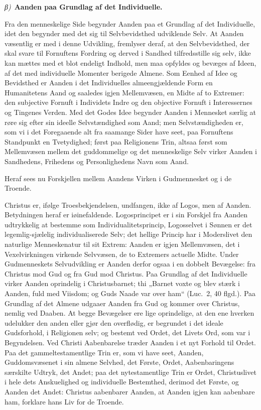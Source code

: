 \documentclass[12pt]{book}
\newcommand{\greekrun}[2]{%
  \medskip\begin{center}{\itshape #1)}\ {\bfseries #2}\end{center}\medskip}
\begin{document}
\greekrun{β}{Aanden paa Grundlag af det Individuelle.}

Fra den menneskelige Side begynder Aanden paa et Grundlag af det
Individuelle, idet den begynder med det sig til Selvbevidsthed
udviklende Selv. At Aanden væsentlig er med i denne Udvikling,
fremlyser deraf, at den Selvbevidsthed, der skal svare til
Fornuftens Fordring og derved i Sandhed tilfredsstille sig selv,
ikke kan mættes med et blot endeligt Indhold, men maa opfyldes og
bevæges af Ideen, af det med individuelle Momenter berigede Almene.
Som Eenhed af Idee og Bevidsthed er Aanden i det Individuelles
almeengjældende Form en Humanitetens Aand og saaledes igjen
Mellemvæsen, en Midte af to Extremer: den subjective Fornuft i
Individets
Indre og den objective Fornuft i Interessernes og Tingenes Verden.
Med det Godes Idee begynder Aanden i Mennesket særlig at røre sig
efter sin ideelle Selvstændighed som Aand; men Selvstændigheden er,
som vi i det Foregaaende alt fra saamange Sider have seet, paa
Fornuftens Standpunkt en Tvetydighed; først paa Religionens Trin,
altsaa først som Mellemvæsen mellem det guddommelige og det
menneskelige Selv virker Aanden i Sandhedens, Frihedens og
Personlighedens Navn som Aand.

Heraf sees nu Forskjellen mellem Aandens Virken i Gudmennesket og i
de Troende.

Christus er, ifølge Troesbekjendelsen, undfangen, ikke af Logos, men
af Aanden. Betydningen heraf er iøinefaldende. Logosprincipet er i
sin Forskjel fra Aanden udtrykkelig at bestemme som
Individualitetsprincip, Logosselvet i Sønnen er det
legemlig-sjælelig individualiserede Selv; det hellige Princip har i
Moderslivet den naturlige Menneskenatur til sit Extrem: Aanden er
igjen Mellemvæsen, det i Vexelvirkningen virkende Selvvæsen, de to
Extremers actuelle Midte. Under Gudmenneskets Selvudvikling er
Aanden derfor ogsaa i en dobbelt Bevægelse: fra Christus mod Gud og
fra Gud mod Christus. Paa Grundlag af det Individuelle virker Aanden
oprindelig i Christusbarnet; thi „Barnet voxte og blev stærk i
Aanden, fuld med Viisdom; og Guds Naade var over ham“ (Luc.\ 2, 40
flgd.). Paa Grundlag af det Almene udgaaer Aanden fra Gud og kommer
over Christus, nemlig ved Daaben. At begge Bevægelser ere lige
oprindelige, at den ene hverken udelukker den anden eller gjør den
overflødig, er begrundet i det ideale Gudsforhold, i Religionen
selv; og bestemt ved Ordet, det Livets Ord, som var i Begyndelsen.
Ved Christi Aabenbarelse træder Aanden i et nyt Forhold til Ordet.
Paa det gammeltestamentlige Trin er, som vi have seet, Aanden,
Guddomsvæsenet i sin almene Selvhed, det Første, Ordet,
Aabenbaringens
særskilte Udtryk, det Andet; paa det nytestamentlige Trin er Ordet,
Christuslivet i hele dets Anskuelighed og individuelle Bestemthed,
derimod det Første, og Aanden det Andet: Christus aabenbarer Aanden,
at Aanden igjen kan aabenbare ham, forklare hans Liv for de Troende.
\end{document}
